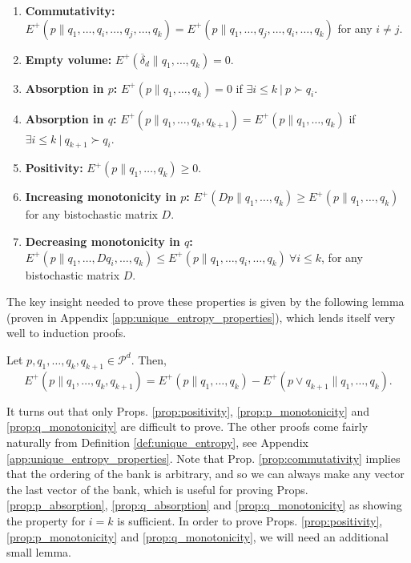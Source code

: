 \begin{enumerate}
    \item \textbf{Commutativity:} $E^+(p \parallel q_1, \dots, q_i, \dots, q_j, \dots, q_k) = E^+(p \parallel q_1, \dots, q_j, \dots, q_i, \dots, q_k)$ for any $i \neq j$. \label{prop:commutativity}
    \item \textbf{Empty volume:} $E^+(\overline{\delta}_d \parallel q_1, \dots, q_k) = 0$. \label{prop:empty}
    \item \textbf{Absorption in $p$:} $E^+(p \parallel q_1, \dots, q_k) = 0$ if $\exists i \leq k \: | \: p \succ q_i$. \label{prop:p_absorption}
    \item \textbf{Absorption in $q$:} $E^+(p \parallel q_1, \dots, q_k, q_{k+1}) = E^+(p \parallel q_1, \dots, q_k)$ if $\exists i \leq k \: | \: q_{k+1} \succ q_i$. \label{prop:q_absorption}
    \item \textbf{Positivity:} $E^+(p \parallel q_1, \dots, q_k) \geq 0$. \label{prop:positivity}
    \item \textbf{Increasing monotonicity in $p$:} $E^+(Dp \parallel q_1, \dots, q_k) \geq E^+(p \parallel q_1, \dots, q_k)$ for any bistochastic matrix $D$. \label{prop:p_monotonicity}
    \item \textbf{Decreasing monotonicity in $q$:} $E^+(p \parallel q_1, \dots, Dq_i, \dots, q_k) \leq E^+(p \parallel q_1, \dots, q_i, \dots, q_k) \: \forall i \leq k$,  for any bistochastic matrix $D$. \label{prop:q_monotonicity}
\end{enumerate}

\noindent The key insight needed to prove these properties is given by the following lemma (proven in Appendix \ref{app:unique_entropy_properties}), which lends itself very well to induction proofs.

\begin{lemma} \label{lem:induction_trick}
    Let $p, q_1, \dots, q_k, q_{k+1} \in \mathcal{P}^d$. Then,
    \begin{equation}
        E^+(p \parallel q_1, \dots, q_k, q_{k+1}) = E^+(p \parallel q_1, \dots, q_k) - E^+(p \vee q_{k+1} \parallel q_1, \dots, q_k).
    \end{equation}
\end{lemma}

It turns out that only Props. \ref{prop:positivity}, \ref{prop:p_monotonicity} and \ref{prop:q_monotonicity} are difficult to prove. The other proofs come fairly naturally from Definition \ref{def:unique_entropy}, see Appendix \ref{app:unique_entropy_properties}. Note that Prop. \ref{prop:commutativity} implies that the ordering of the bank is arbitrary, and so we can always make any vector the last vector of the bank, which is useful for proving Props. \ref{prop:p_absorption}, \ref{prop:q_absorption} and \ref{prop:q_monotonicity} as showing the property for $i = k$ is sufficient. In order to prove Props. \ref{prop:positivity}, \ref{prop:p_monotonicity} and \ref{prop:q_monotonicity}, we will need an additional small lemma.

